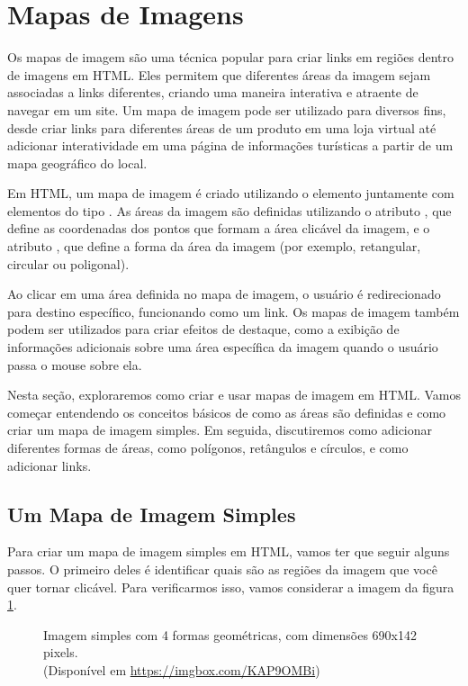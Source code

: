 \section{Mapas de Imagens}

Os mapas de imagem são uma técnica popular para criar links em regiões dentro de imagens em HTML. Eles permitem que diferentes áreas da imagem sejam associadas a links diferentes, criando uma maneira interativa e atraente de navegar em um site. Um mapa de imagem pode ser utilizado para diversos fins, desde criar links para diferentes áreas de um produto em uma loja virtual até adicionar interatividade em uma página de informações turísticas a partir de um mapa geográfico do local.

Em HTML, um mapa de imagem é criado utilizando o elemento  juntamente com elementos do tipo . As áreas da imagem são definidas utilizando o atributo , que define as coordenadas dos pontos que formam a área clicável da imagem, e o atributo , que define a forma da área da imagem (por exemplo, retangular, circular ou poligonal).

Ao clicar em uma área definida no mapa de imagem, o usuário é redirecionado para destino específico, funcionando como um link. Os mapas de imagem também podem ser utilizados para criar efeitos de destaque, como a exibição de informações adicionais sobre uma área específica da imagem quando o usuário passa o mouse sobre ela.

Nesta seção, exploraremos como criar e usar mapas de imagem em HTML. Vamos começar entendendo os conceitos básicos de como as áreas são definidas e como criar um mapa de imagem simples. Em seguida, discutiremos como adicionar diferentes formas de áreas, como polígonos, retângulos e círculos, e como adicionar links.

\subsection{Um Mapa de Imagem Simples}

Para criar um mapa de imagem simples em HTML, vamos ter que seguir alguns passos. O primeiro deles é identificar quais são as regiões da imagem que você quer tornar clicável. Para verificarmos isso, vamos considerar a imagem da figura \ref{fig:formas}.

\begin{figure}[ht!]
    \caption{Imagem simples com 4 formas geométricas, com dimensões 690x142 pixels. \\(Disponível em \url{https://imgbox.com/KAP9OMBi})}
    \label{fig:formas}
\end{figure}

